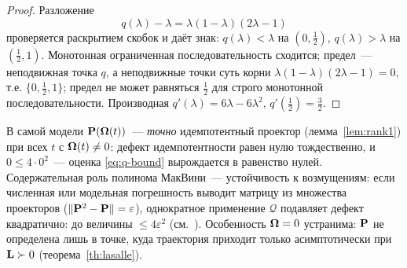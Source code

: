 \begin{proof}
Разложение
\[
  q(\lambda) - \lambda = \lambda(1-\lambda)(2\lambda-1)
\]
проверяется раскрытием скобок и даёт знак: $q(\lambda) < \lambda$ на
$(0,\tfrac12)$, $q(\lambda) > \lambda$ на $(\tfrac12,1)$. Монотонная
ограниченная последовательность сходится; предел~--- неподвижная точка
$q$, а неподвижные точки суть корни $\lambda(1-\lambda)(2\lambda-1)=0$,
т.е. $\{0,\tfrac12,1\}$; предел не может равняться $\tfrac12$ для
строго монотонной последовательности. Производная
$q'(\lambda) = 6\lambda-6\lambda^2$, $q'(\tfrac12) = \tfrac32$.
\end{proof}

\begin{remark}
В самой модели $\mathbf{P}(\boldsymbol{\Omega}(t))$~--- \emph{точно} идемпотентный проектор
(лемма~\ref{lem:rank1}) при всех $t$ с $\boldsymbol{\Omega}(t) \ne 0$: дефект
идемпотентности равен нулю тождественно, и $0 \le 4\cdot 0^2$~--- оценка
\eqref{eq:q-bound} вырождается в равенство нулей. Содержательная роль
полинома МакВини~--- устойчивость к возмущениям: если численная или
модельная погрешность выводит матрицу из множества проекторов
($\|\mathbf{P}^2-\mathbf{P}\| = \varepsilon$), однократное применение $\mathcal Q$
подавляет дефект квадратично: до величины $\le 4\varepsilon^2$
(см.~\cite{mcweeny}). Особенность $\boldsymbol{\Omega} = 0$ устранима: $\mathbf{P}$ не
определена лишь в точке, куда траектория приходит только
асимптотически при $\mathbf{L} \succ 0$ (теорема~\ref{th:lasalle}).
\end{remark}
